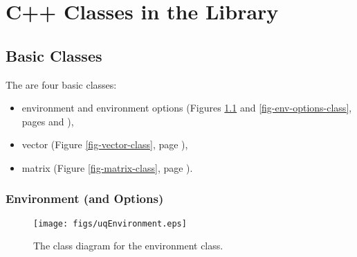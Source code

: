 \chapter{C++ Classes in the Library}\label{ch-classes}
\thispagestyle{headings}



\section{Basic Classes}

The are four basic classes:
\begin{itemize}
\item environment and environment options (Figures \ref{fig-env-class} and \ref{fig-env-options-class}, pages \pageref{fig-env-class} and \pageref{fig-env-options-class}),
\item vector (Figure \ref{fig-vector-class}, page \pageref{fig-vector-class}),
\item matrix (Figure \ref{fig-matrix-class}, page \pageref{fig-matrix-class}).
\end{itemize}

\clearpage
\subsection{Environment (and Options)}

\begin{figure}[h!]
\begin{center}
\texttt{[image: figs/uqEnvironment.eps]}
\end{center}
\caption{
The class diagram for the environment class.
}
\label{fig-env-class}
\end{figure}

